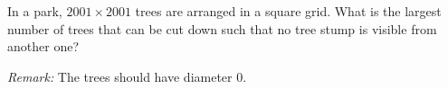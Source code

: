 In a park, $2001 \times 2001$ trees are arranged in a square grid.
What is the largest number of trees that can be cut down such
that no tree stump is visible from another one?

\emph{Remark:} The trees should have diameter $0$.
